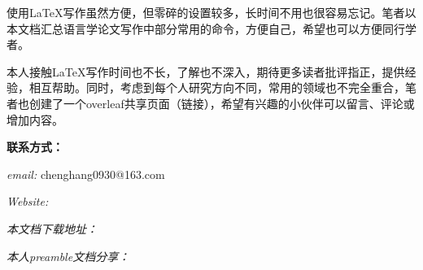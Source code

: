 \documentclass[a4paper,12pt]{article}
\begin{document}
使用LaTeX写作虽然方便，但零碎的设置较多，长时间不用也很容易忘记。笔者以本文档汇总语言学论文写作中部分常用的命令，方便自己，希望也可以方便同行学者。

本人接触LaTeX写作时间也不长，了解也不深入，期待更多读者批评指正，提供经验，相互帮助。同时，考虑到每个人研究方向不同，常用的领域也不完全重合，笔者也创建了一个overleaf共享页面（链接），希望有兴趣的小伙伴可以留言、评论或增加内容。

\vspace{15mm}
\noindent \textbf{联系方式：}

\noindent \textit{email:} chenghang0930@163.com

\noindent \textit{Website:}

\noindent \textit{本文档下载地址：}

\noindent \textit{本人preamble文档分享：}

	
\newpage

		
	
\end{document}
